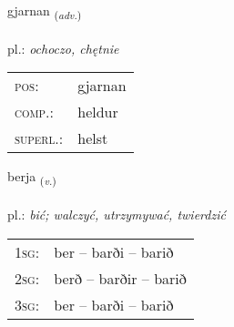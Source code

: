 \documentclass[frontgrid, backgrid]{flacards}\usepackage[]{graphicx}\usepackage[]{xcolor}
\begin{document}
\renewcommand{\flhead}{\vskip5pt \fboxsep=0pt {\small\bfseries\footnotesize Atviksorð | Adverb}}
\renewcommand{\fcfoot}{\vskip5pt \fboxsep=0pt \hspace{2pt}{\small\bfseries\footnotesize 1K}}

\renewcommand{\blhead}{\vskip5pt {\small\bfseries\footnotesize Atviksorð | Adverb }}
\renewcommand{\bcfoot}{\vskip5pt \hspace{2pt}{\small\bfseries\footnotesize 1K}}


{gjarnan \small{\textsubscript{(\textit{adv.})}} \\[1ex] %
\textphonetic{[cartnan]} \\
pl.: \emph{ochoczo, chętnie} \\  [2ex]
\renewcommand*{\arraystretch}{0.8}
\begin{tabular}{ll}
\textsc{pos}: & gjarnan \\ 
\textsc{comp.}: & heldur \\ 
\textsc{superl.}: & helst \\
\end{tabular}
}

\renewcommand{\flhead}{\vskip5pt \fboxsep=0pt {\small\bfseries\footnotesize Sagnorð | Verb}}
\renewcommand{\fcfoot}{\vskip5pt \fboxsep=0pt \hspace{2pt}{\small\bfseries\footnotesize 1K}}

\renewcommand{\blhead}{\vskip5pt {\small\bfseries\footnotesize Sagnorð | Verb }}
\renewcommand{\bcfoot}{\vskip5pt \hspace{2pt}{\small\bfseries\footnotesize 1K}}


{berja \small{\textsubscript{(\textit{v.})}} \\[1ex] %
\textphonetic{[pɛrja]} \\
pl.: \emph{bić; walczyć, utrzymywać, twierdzić} \\  [2ex]
\renewcommand*{\arraystretch}{0.8}
\begin{tabular}{p{1cm}l}
\textsc{1sg}: & ber -- barði -- barið \\ 
\textsc{2sg}: & berð -- barðir -- barið \\ 
\textsc{3sg}: & ber -- barði -- barið \\ 
\end{tabular}
}
\end{document}
